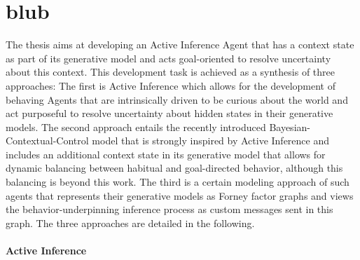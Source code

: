 \chapter{blub}


The thesis aims at developing an Active Inference Agent that has a context state as part of its generative model and acts goal-oriented to resolve uncertainty about this context. This development task is achieved as a synthesis of three approaches: The first is Active Inference which allows for the development of behaving Agents that are intrinsically driven to be curious about the world and act purposeful to resolve uncertainty about hidden states in their generative models. The second approach entails the recently introduced Bayesian-Contextual-Control model that is strongly inspired by Active Inference and includes an additional context state in its generative model that allows for dynamic balancing between habitual and goal-directed behavior, although this balancing is beyond this work. The third is a certain modeling approach of such agents that represents their generative models as Forney factor graphs and views the behavior-underpinning inference process as custom messages sent in this graph. The three approaches are detailed in the following.

\subsubsection{Active Inference}


